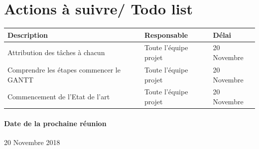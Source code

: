 \documentclass{article}
\begin{document}
\section{Actions à suivre/ Todo list}

\begin{tabular}{|C{5cm}|C{3cm}|C{3cm}|}
\hline {} Description & Responsable & Délai \\
\hline  Attribution des tâches à chacun & Toute l'équipe projet  & 20 Novembre  \\
\hline 
Comprendre les étapes  commencer le GANTT & Toute l'équipe projet  & 20 Novembre \\
\hline  Commencement de l'Etat de l'art & Toute l'équipe projet  & 20 Novembre  \\
\hline
\end{tabular}

\paragraph{Date de la prochaine réunion}
20 Novembre 2018
\end{document}

